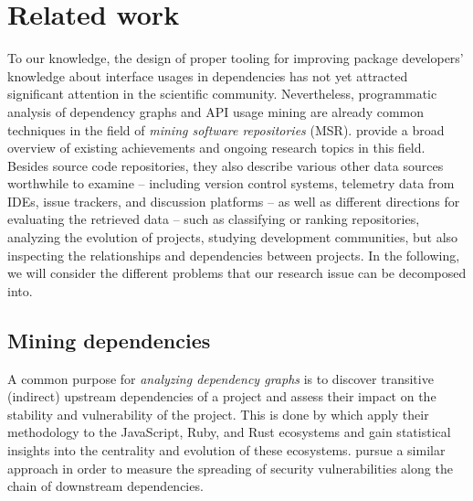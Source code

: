 \section{Related work}
\label{sec:related_work}

To our knowledge, the design of proper tooling for improving package developers' knowledge about interface usages in dependencies has not yet attracted significant attention in the scientific community.
Nevertheless, programmatic analysis of dependency graphs and API usage mining are already common techniques in the field of \emph{mining software repositories} (MSR).
\citet{chaturvedi2013tools} provide a broad overview of existing achievements and ongoing research topics in this field.
Besides source code repositories, they also describe various other data sources worthwhile to examine -- including version control systems, telemetry data from IDEs, issue trackers, and discussion platforms -- as well as different directions for evaluating the retrieved data -- such as classifying or ranking repositories, analyzing the evolution of projects, studying development communities, but also inspecting the relationships and dependencies between projects.
In the following, we will consider the different problems that our research issue can be decomposed into.

\subsection{Mining dependencies}
\label{sec:related_work/dependencies}

A common purpose for \emph{analyzing dependency graphs} is to discover transitive (indirect) upstream dependencies of a project and assess their impact on the stability and vulnerability of the project.
This is done by \citet{kikas2017structure} which apply their methodology to the JavaScript, Ruby, and Rust ecosystems and gain statistical insights into the centrality and evolution of these ecosystems.
\citet{decan2018impact} pursue a similar approach in order to measure the spreading of security vulnerabilities along the chain of downstream dependencies.


